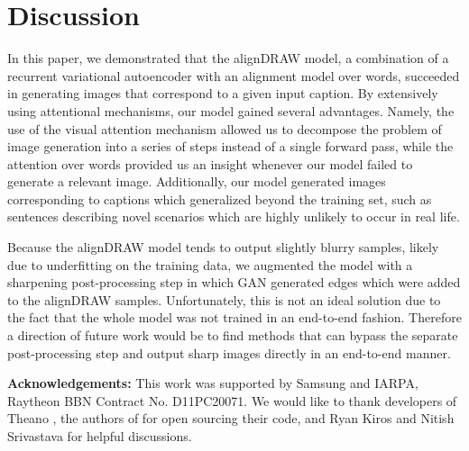 \documentclass{article} %
\begin{document}
\section{Discussion}
\vspace{-0.1in}
In this paper, we demonstrated that the alignDRAW model, a combination of a recurrent variational autoencoder with an alignment model over words, succeeded in generating images that correspond to a given input caption. By extensively using attentional mechanisms, our model gained several advantages. Namely, the use of the visual attention mechanism allowed us to decompose the problem of image generation into a series of steps instead of a single forward pass, while the attention over words provided us an insight whenever our model failed to generate a relevant image. Additionally, our model generated images corresponding to captions which generalized beyond the training set, such as sentences describing novel scenarios which are highly unlikely to occur in real life.

Because the alignDRAW model tends to output slightly blurry samples, likely due to underfitting on the training data, we augmented the model with a sharpening post-processing step in which GAN generated edges which were added to the alignDRAW samples. Unfortunately, this is not an ideal solution due to the fact that the whole model was not trained in an end-to-end fashion. Therefore a direction of future work would be to find methods that can bypass the separate post-processing step and output sharp images directly in an end-to-end manner. 

{\small
{\bf Acknowledgements:}
This work was supported by Samsung and IARPA, Raytheon BBN Contract No. D11PC20071.
We would like to thank developers of Theano \citep{theano}, the authors of \citep{denton_lapgan} for open sourcing their code, and Ryan Kiros and Nitish Srivastava for helpful discussions. 
}

{\small


}

\newpage
\appendix

\end{document}
